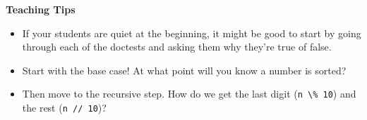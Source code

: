 \begin{guide}
\begin{blocksection}
  \textbf{Teaching Tips}
  \begin{itemize}
      \item If your students are quiet at the beginning, it might be good to start by going through each of the doctests and asking them why they're true of false.
      \item Start with the base case! At what point will you know a number is sorted?
      \item Then move to the recursive step. How do we get the last digit (\lstinline{n \% 10}) and the rest (\lstinline{n // 10})?
  \end{itemize}
\end{blocksection}
\end{guide}
